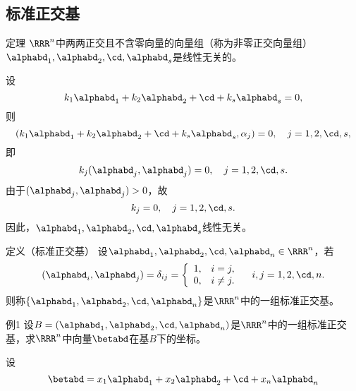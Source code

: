 \subsection{标准正交基}

\begin{frame}
  \begin{footnotesize}
    \begin{block}{定理}
      $\RRR^n$中两两正交且不含零向量的向量组（称为非零正交向量组）$\alphabd_1,\alphabd_2,\cd,\alphabd_s$是线性无关的。
    \end{block}
    \pause\proofname
    设
    $$
    k_1\alphabd_1+k_2\alphabd_2+\cd+k_s\alphabd_s=0,
    $$
    则
    $$
    (k_1\alphabd_1+k_2\alphabd_2+\cd+k_s\alphabd_s,\alpha_j)=0, \quad j=1,2,\cd,s,
    $$
    即
    $$
   k_j(\alphabd_j,\alphabd_j)=0, \quad j=1,2,\cd,s.
    $$
    由于$(\alphabd_j,\alphabd_j)>0$，故
    $$
    k_j=0, \quad j=1,2,\cd,s.
    $$
    因此，$\alphabd_1,\alphabd_2,\cd,\alphabd_s$线性无关。
  \end{footnotesize}
\end{frame}


\begin{frame}
  \begin{footnotesize}
    \begin{block}{定义（标准正交基）}
      设$\alphabd_1,\alphabd_2,\cd,\alphabd_n\in \RRR^n$，若
      $$
      (\alphabd_i,\alphabd_j)=\delta_{ij}=\left\{
      \begin{array}{ll}
        1,& i=j,\\
        0,& i\ne j.
      \end{array}
      \right. \quad i,j=1,2,\cd,n.
      $$
      则称$\{\alphabd_1,\alphabd_2,\cd,\alphabd_n\}$是$\RRR^n$中的一组标准正交基。
    \end{block}
  \end{footnotesize}
\end{frame}


\begin{frame}
  \begin{footnotesize}
    \begin{exampleblock}{例1}
      设$B=(\alphabd_1,\alphabd_2,\cd,\alphabd_n)$是$\RRR^n$中的一组标准正交基，求$\RRR^n$中向量$\betabd$在基$B$下的坐标。
    \end{exampleblock}
    \pause\jiename
    设
    $$
    \betabd=x_1\alphabd_1+x_2\alphabd_2+\cd+x_n\alphabd_n
    $$
  \end{footnotesize}
\end{frame}
